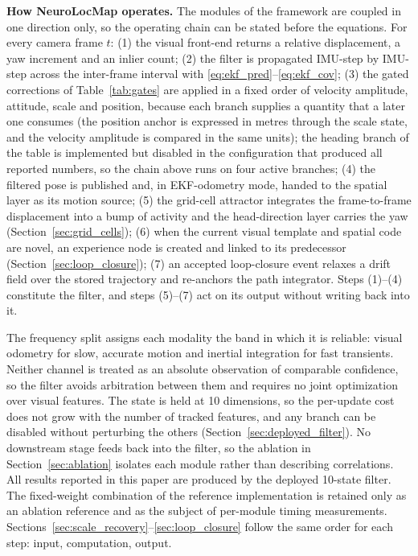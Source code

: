 \textbf{How NeuroLocMap operates.} The modules of the framework are coupled in one direction only, so the operating chain can be stated before the equations. For every camera frame $t$: (1) the visual front-end returns a relative displacement, a yaw increment and an inlier count; (2) the filter is propagated IMU-step by IMU-step across the inter-frame interval with \eqref{eq:ekf_pred}--\eqref{eq:ekf_cov}; (3) the gated corrections of Table~\ref{tab:gates} are applied in a fixed order of velocity amplitude, attitude, scale and position, because each branch supplies a quantity that a later one consumes (the position anchor is expressed in metres through the scale state, and the velocity amplitude is compared in the same units); the heading branch of the table is implemented but disabled in the configuration that produced all reported numbers, so the chain above runs on four active branches; (4) the filtered pose is published and, in EKF-odometry mode, handed to the spatial layer as its motion source; (5) the grid-cell attractor integrates the frame-to-frame displacement into a bump of activity and the head-direction layer carries the yaw (Section~\ref{sec:grid_cells}); (6) when the current visual template and spatial code are novel, an experience node is created and linked to its predecessor (Section~\ref{sec:loop_closure}); (7) an accepted loop-closure event relaxes a drift field over the stored trajectory and re-anchors the path integrator. Steps (1)--(4) constitute the filter, and steps (5)--(7) act on its output without writing back into it.

The frequency split assigns each modality the band in which it is reliable: visual odometry for slow, accurate motion and inertial integration for fast transients. Neither channel is treated as an absolute observation of comparable confidence, so the filter avoids arbitration between them and requires no joint optimization over visual features. The state is held at 10 dimensions, so the per-update cost does not grow with the number of tracked features, and any branch can be disabled without perturbing the others (Section~\ref{sec:deployed_filter}). No downstream stage feeds back into the filter, so the ablation in Section~\ref{sec:ablation} isolates each module rather than describing correlations. All results reported in this paper are produced by the deployed 10-state filter. The fixed-weight combination of the reference implementation is retained only as an ablation reference and as the subject of per-module timing measurements. Sections~\ref{sec:scale_recovery}--\ref{sec:loop_closure} follow the same order for each step: input, computation, output.

